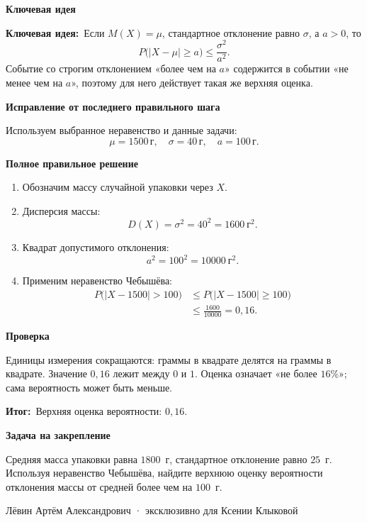 \documentclass[a4paper,12pt]{article}
\newcommand{\idea}{\textcolor{deepaccent}{\textbf{Ключевая идея:}}\ }
\newcommand{\outcome}{\textcolor{deepaccent}{\textbf{Итог:}}\ }
\newcommand{\lab}[1]{\par\noindent\textbf{#1}\par\vspace{-4pt}}
\begin{document}
\lab{Ключевая идея}
\idea Если $M(X)=\mu$, стандартное отклонение равно $\sigma$, а $a>0$, то
\[
P\bigl(|X-\mu|\ge a\bigr)\le \frac{\sigma^2}{a^2}.
\]
Событие со строгим отклонением «более чем на $a$» содержится в событии «не менее чем на $a$», поэтому для него действует такая же верхняя оценка.

\lab{Исправление от последнего правильного шага}
Используем выбранное неравенство и данные задачи:
\[
\mu=1500\,\text{г},\quad \sigma=40\,\text{г},\quad a=100\,\text{г}.
\]

\lab{Полное правильное решение}
\begin{enumerate}
\item Обозначим массу случайной упаковки через $X$.
\item Дисперсия массы:
\[
D(X)=\sigma^2=40^2=1600\ \text{г}^2.
\]
\item Квадрат допустимого отклонения:
\[
a^2=100^2=10000\ \text{г}^2.
\]
\item Применим неравенство Чебышёва:
\[
\begin{aligned}
P\bigl(|X-1500|>100\bigr)
&\le P\bigl(|X-1500|\ge100\bigr)\\
&\le\frac{1600}{10000}=\boxed{0{,}16}.
\end{aligned}
\]
\end{enumerate}

\lab{Проверка}
Единицы измерения сокращаются: граммы в квадрате делятся на граммы в квадрате. Значение $0{,}16$ лежит между $0$ и $1$. Оценка означает «не более $16\%$»; сама вероятность может быть меньше.

\outcome Верхняя оценка вероятности: $0{,}16$.

\lab{Задача на закрепление}
Средняя масса упаковки равна $1800$~г, стандартное отклонение равно $25$~г. Используя неравенство Чебышёва, найдите верхнюю оценку вероятности отклонения массы от средней более чем на $100$~г.

\endgroup
\vfill
{\small\textcolor{softgray}{Лёвин Артём Александрович · эксклюзивно для Ксении Клыковой}}
\end{document}
